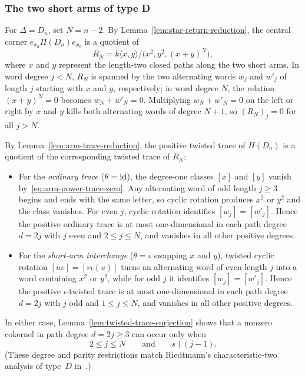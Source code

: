 \subsubsection{The two short arms of type D}

For $\Delta=D_n$, set $N=n-2$. By Lemma~\ref{lem:star-return-reduction}, the central corner $e_{x_0}\Pi(D_n)e_{x_0}$ is a quotient of
\[
  R_N=k\langle x,y\rangle/\bigl(x^2,y^2,(x+y)^N\bigr),
\]
where $x$ and $y$ represent the length-two closed paths along the two short arms. In word degree $j<N$, $R_N$ is spanned by the two alternating words $w_j$ and $w'_j$ of length $j$ starting with $x$ and $y$, respectively; in word degree $N$, the relation $(x+y)^N=0$ becomes $w_N+w'_N=0$. Multiplying $w_N+w'_N=0$ on the left or right by $x$ and $y$ kills both alternating words of degree $N+1$, so $(R_N)_j=0$ for all $j>N$.

By Lemma~\ref{lem:arm-trace-reduction}, the positive twisted trace of $\Pi(D_n)$ is a quotient of the corresponding twisted trace of $R_N$:
\begin{itemize}
\item For the \emph{ordinary trace} ($\theta=\operatorname{id}$), the degree-one classes $[x]$ and $[y]$ vanish by~\eqref{eq:arm-power-trace-zero}. Any alternating word of odd length $j\geq3$ begins and ends with the same letter, so cyclic rotation produces $x^2$ or $y^2$ and the class vanishes. For even $j$, cyclic rotation identifies $[w_j]=[w'_j]$. Hence the positive ordinary trace is at most one-dimensional in each path degree $d=2j$ with $j$ even and $2\leq j\leq N$, and vanishes in all other positive degrees.
\item For the \emph{short-arm interchange} ($\theta=\iota$ swapping $x$ and $y$), twisted cyclic rotation $[uv]=[v\iota(u)]$ turns an alternating word of even length $j$ into a word containing $x^2$ or $y^2$, while for odd $j$ it identifies $[w_j]=[w'_j]$. Hence the positive $\iota$-twisted trace is at most one-dimensional in each path degree $d=2j$ with $j$ odd and $1\leq j\leq N$, and vanishes in all other positive degrees.
\end{itemize}
In either case, Lemma~\ref{lem:twisted-trace-surjection} shows that a nonzero cokernel in path degree $d=2j\geq3$ can occur only when
\begin{equation}
  2\leq j\leq N\qquad\text{and}\qquad s\mid(j-1).
  \label{eq:d-possible-correction}
\end{equation}
(These degree and parity restrictions match Riedtmann's characteristic-two analysis of type~$D$ in~\cite[Section~2, p.~487, and Sections~3.3, 3.9]{Riedtmann1984}.)

